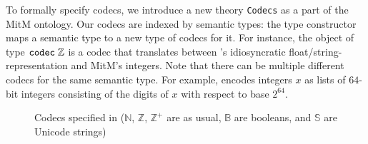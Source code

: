 To formally specify codecs, we introduce a new \ommt theory \texttt{Codecs} as a part of the MitM ontology.
Our codecs are indexed by semantic types: the type constructor \codectt maps a semantic type to a new type of codecs for it.
For instance, the object  of type $\codectt\;\mathbb{Z}$ is a codec that translates between \lmfdb's idiosyncratic float/string-representation and MitM's integers.
Note that there can be multiple different codecs for the same semantic type.
For example,  encodes integers $x$ as lists of $64$-bit integers consisting of the digits of $x$ with respect to base $2^{64}$.

\begin{figure}[ht]\centering
  \caption[List of Codecs]{
    Codecs specified in \mmt ($\mathbb{N}$, $\mathbb{Z}$, $\mathbb{Z}^{+}$ are as usual, $\mathbb{B}$ are booleans, and
    $\mathbb{S}$ are Unicode strings)
  }
  \label{fig:codecs}
\end{figure}

